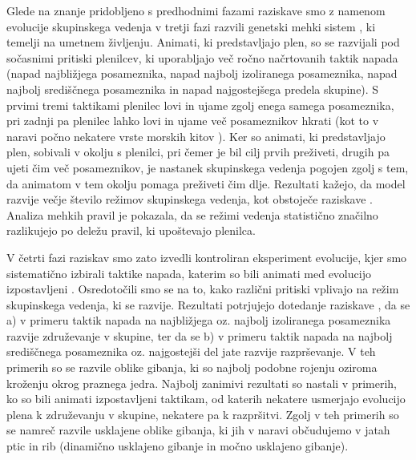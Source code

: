 \begin{razsirjeniPovzetek}
Glede na znanje pridobljeno s predhodnimi fazami raziskave smo z namenom evolucije skupinskega vedenja v tretji fazi razvili genetski mehki sistem \cite{demsar2017evolution}, ki temelji na umetnem življenju. Animati, ki predstavljajo plen, so se razvijali pod sočasnimi pritiski plenilcev, ki uporabljajo več ročno načrtovanih taktik napada (napad najbližjega posameznika, napad najbolj izoliranega posameznika, napad najbolj središčnega posameznika in napad najgostejšega predela skupine). S prvimi tremi taktikami plenilec lovi in ujame zgolj enega samega posameznika, pri zadnji pa plenilec lahko lovi in ujame več posameznikov hkrati (kot to v naravi počno nekatere vrste morskih kitov \cite{domenici2001scaling,goldbogen2011mechanics,nottestad1999herring,nottestad2002whales}). Ker so animati, ki predstavljajo plen, sobivali v okolju s plenilci, pri čemer je bil cilj prvih preživeti, drugih pa ujeti čim več posameznikov, je nastanek skupinskega vedenja pogojen zgolj s tem, da animatom v tem okolju pomaga preživeti čim dlje. Rezultati kažejo, da model razvije večje število režimov skupinskega vedenja, kot obstoječe raziskave \cite{biswas2014causes,hein2015evolution,olson2013predator,olson2015exploring,olson2016evolution,reynolds1993evolved,sayers2009evolved,spector2003emergence,wood2007evolving}. Analiza mehkih pravil je pokazala, da se režimi vedenja statistično značilno razlikujejo po deležu pravil, ki upoštevajo plenilca.

V četrti fazi raziskav smo zato izvedli kontroliran eksperiment evolucije, kjer smo sistematično izbirali taktike napada, katerim so bili animati med evolucijo izpostavljeni \cite{demsar2016balanced}. Osredotočili smo se na to, kako različni pritiski vplivajo na režim skupinskega vedenja, ki se razvije. Rezultati potrjujejo dotedanje raziskave \cite{biswas2014causes,olson2013predator,olson2016evolution,wood2007evolving}, da se a) v primeru taktik napada na najbližjega oz. najbolj izoliranega posameznika razvije združevanje v skupine, ter da se b) v primeru taktik napada na najbolj središčnega posameznika oz. najgostejši del jate razvije razprševanje. V teh primerih so se razvile oblike gibanja, ki so najbolj podobne rojenju oziroma kroženju okrog praznega jedra. Najbolj zanimivi rezultati so nastali v primerih, ko so bili animati izpostavljeni taktikam, od katerih nekatere usmerjajo evolucijo plena k združevanju v skupine, nekatere pa k razpršitvi. Zgolj v teh primerih so se namreč razvile usklajene oblike gibanja, ki jih v naravi občudujemo v jatah ptic in rib (dinamično usklajeno gibanje in močno usklajeno gibanje).


\end{razsirjeniPovzetek}

